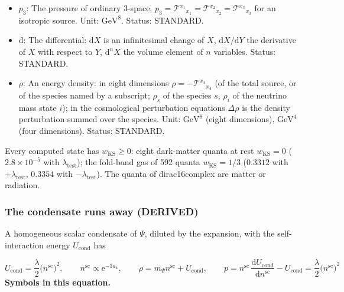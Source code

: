 \documentclass[
  10pt,
]{article}
\begin{document}
\begin{itemize}
  Status: DERIVED.
\item
  \(p_3\): The pressure of ordinary 3-space,
  \(p_3 = \mathcal{T}^{x_1}{}_{x_1} = \mathcal{T}^{x_2}{}_{x_2} = \mathcal{T}^{x_3}{}_{x_3}\)
  for an isotropic source. Unit: \(\mathrm{GeV}^{8}\). Status: STANDARD.
\item
  \(\mathrm{d}\): The differential: \(\mathrm{d}X\) is an infinitesimal
  change of \(X\), \(\mathrm{d}X/\mathrm{d}Y\) the derivative of \(X\)
  with respect to \(Y\), \(\mathrm{d}^nX\) the volume element of \(n\)
  variables. Status: STANDARD.
\item
  \(\rho\): An energy density: in eight dimensions
  \(\rho = -\mathcal{T}^{x_4}{}_{x_4}\) (of the total source, or of the
  species named by a subscript; \(\rho_s\) of the species \(s\),
  \(\rho_i\) of the neutrino mass state \(i\)); in the cosmological
  perturbation equations \(\Delta\rho\) is the density perturbation
  summed over the species. Unit: \(\mathrm{GeV}^{8}\) (eight
  dimensions), \(\mathrm{GeV}^{4}\) (four dimensions). Status: STANDARD.
\end{itemize}

Every computed state has \(w_{\mathrm{KS}} \ge 0\): eight dark-matter
quanta at rest \(w_{\mathrm{KS}} = 0\) (\(2.8\times10^{-5}\) with
\(\lambda_{\mathrm{test}}\)); the fold-band gas of 592 quanta
\(w_{\mathrm{KS}} = 1/3\) (\(0.3312\) with \(+\lambda_{\mathrm{test}}\),
\(0.3354\) with \(-\lambda_{\mathrm{test}}\)). The quanta of
dirac16complex are matter or radiation.

\hypertarget{the-condensate-runs-away-derived}{%
\subsubsection*{The condensate runs away
(DERIVED)}\label{the-condensate-runs-away-derived}}

A homogeneous scalar condensate of \(\Psi\), diluted by the expansion,
with the self-interaction energy \(U_{\mathrm{cond}}\) has

\[ U_{\mathrm{cond}} = \frac{\lambda}{2}\big(n^{\mathrm{sc}}\big)^2,\qquad n^{\mathrm{sc}} \propto \mathrm{e}^{-3a_4},\qquad \rho = m_\Psi n^{\mathrm{sc}} + U_{\mathrm{cond}},\qquad p = n^{\mathrm{sc}}\,\frac{\mathrm{d}U_{\mathrm{cond}}}{\mathrm{d}n^{\mathrm{sc}}} - U_{\mathrm{cond}} = \frac{\lambda}{2}\big(n^{\mathrm{sc}}\big)^2 \]
\textbf{Symbols in this equation.}
\end{document}
